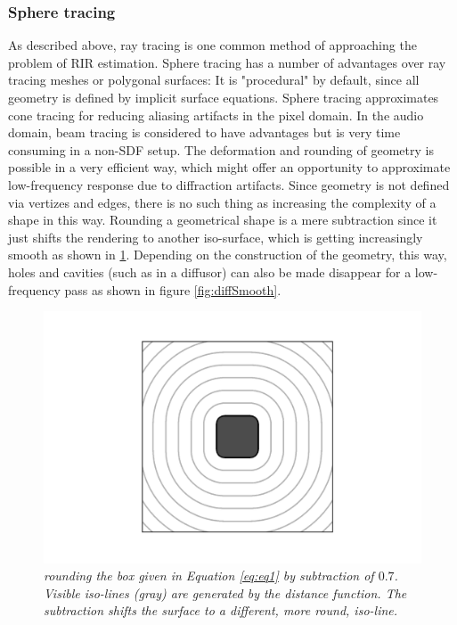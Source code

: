 \documentclass[twoside,a4paper]{article}
\begin{document}
\subsubsection{Sphere tracing}
As described above, ray tracing is one common method of approaching the problem of RIR estimation. Sphere tracing has a number of advantages over ray tracing meshes or polygonal surfaces: It is "procedural" by default, since all geometry is defined by implicit surface equations. Sphere tracing approximates cone tracing for reducing aliasing artifacts in the pixel domain\cite{hart_sphere_1996}. In the audio domain, beam tracing is considered to have advantages but is very time consuming in a non-SDF setup\cite{alpkocak_computing_2010}. The deformation and rounding of geometry is possible in a very efficient way, which might offer an opportunity to approximate low-frequency response due to diffraction artifacts. Since geometry is not defined via vertizes and edges, there is no such thing as increasing the complexity of a shape in this way. Rounding a geometrical shape is a mere subtraction since it just shifts the rendering to another iso-surface, which is getting increasingly smooth as shown in \ref{sdf_2d_box}. Depending on the construction of the geometry, this way, holes and cavities (such as in a diffusor) can also be made disappear for a low-frequency pass as shown in figure \ref{fig:diffSmooth}.

\begin{figure}[ht]
\centerline{\includegraphics[scale=0.6]{img/sdf2dbox.png}}
\caption{\label{sdf_2d_box}{\it rounding the box given in Equation \ref{eq:eq1} by subtraction of $0.7$. Visible iso-lines (gray) are generated by the distance function. The subtraction shifts the surface to a different, more round, iso-line.}}
\end{figure}  
\end{document}
